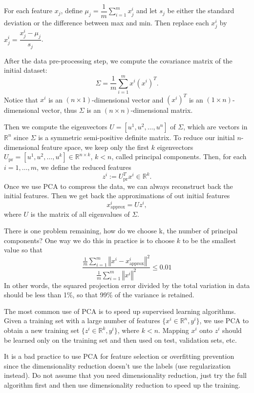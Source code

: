 \documentclass[a4paper,11pt]{report}
\newcommand{\norm}[1]{\left\Vert#1\right\Vert}
\newcommand{\ds}{\displaystyle}
\begin{document}
For each feature $x_j$, define $\mu_j = \dfrac{1}{m}\ds\sum_{i=1}^{m}{x^i_j}$ and let $s_j$ be either the standard deviation or the difference between max and min. Then replace each $x_j^i$ by $x_j^i = \dfrac{x_j^i - \mu_j}{s_j}$.

After the data pre-processing step, we compute the covariance matrix of the initial dataset: $$\Sigma = \dfrac{1}{m} \ds\sum_{i=1}^{m}{x^i(x^i)^T}.$$
Notice that $x^i$ is an $(n\times 1)$-dimensional vector and $(x^i)^T$ is an $(1\times n)$-dimensional vector, thus $\Sigma$ is an $(n\times n)$-dimensional matrix.

Then we compute the eigenvectors $U = [u^1, u^2, \ldots, u^n]$ of $\Sigma$, which are vectors in $\mathbb{R}^n$ since $\Sigma$ is a symmetric semi-positive definite matrix. To reduce our initial $n$-dimensional feature space, we keep only the first $k$ eigenvectors $U_\text{pr} = [u^1, u^2, \ldots, u^k]\in\mathbb{R}^{n\times k}$, $k<n$, called principal components. Then, for each $i=1,\ldots, m$, we define the reduced features
$$z^i := U_\text{pr}^T x^i \in \mathbb{R}^k.$$
Once we use PCA to compress the data, we can always reconstruct back the initial features. Then we get back the approximations of out initial features $$x_{\text{approx}}^i = Uz^i,$$ where $U$ is the matrix of all eigenvalues of $\Sigma$.


There is one problem remaining, how do we choose k, the number of principal components? One way we do this in practice is to choose $k$ to be the smallest value so that
$$\dfrac{\frac{1}{m}\sum_{i=1}^{m}{\norm{x^i - x_{\text{approx}}^i}^2}}{\frac{1}{m}\sum_{i=1}^{m}{\norm{x^i}^2}} \leq 0.01$$
In other words, the squared projection error divided by the total variation in data should be less than 1\%, so that 99\% of the variance is retained.

The most common use of PCA is to speed up supervised learning algorithms. Given a training set with a large number of features $\{x^i\in\mathbb{R}^n, y^i\}$, we use PCA to obtain a new training set $\{z^i\in\mathbb{R}^k, y^i\}$, where $k<n$. Mapping $x^i$ onto $z^i$ should be learned only on the training set and then used on test, validation sets, etc.

It is a bad practice to use PCA for feature selection or overfitting prevention since the dimensionality reduction doesn't use the labels (use regularization instead). Do not assume that you need dimensionality reduction, just try the full algorithm first and then use dimensionality reduction to speed up the training.
\end{document}
